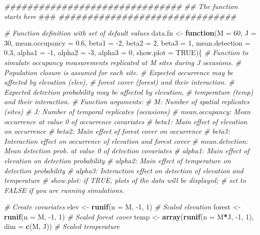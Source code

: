 \documentclass[
]{book}
\newenvironment{Shaded}{\begin{snugshade}}{\end{snugshade}}
\newcommand{\AlertTok}[1]{\textcolor[rgb]{0.94,0.16,0.16}{#1}}
\newcommand{\CommentTok}[1]{\textcolor[rgb]{0.56,0.35,0.01}{\textit{#1}}}
\newcommand{\ControlFlowTok}[1]{\textcolor[rgb]{0.13,0.29,0.53}{\textbf{#1}}}
\newcommand{\DataTypeTok}[1]{\textcolor[rgb]{0.13,0.29,0.53}{#1}}
\newcommand{\DecValTok}[1]{\textcolor[rgb]{0.00,0.00,0.81}{#1}}
\newcommand{\FloatTok}[1]{\textcolor[rgb]{0.00,0.00,0.81}{#1}}
\newcommand{\KeywordTok}[1]{\textcolor[rgb]{0.13,0.29,0.53}{\textbf{#1}}}
\newcommand{\NormalTok}[1]{#1}
\newcommand{\OperatorTok}[1]{\textcolor[rgb]{0.81,0.36,0.00}{\textbf{#1}}}
\newcommand{\OtherTok}[1]{\textcolor[rgb]{0.56,0.35,0.01}{#1}}
\newcommand{\StringTok}[1]{\textcolor[rgb]{0.31,0.60,0.02}{#1}}
\begin{document}
\begin{Shaded}
\begin{Highlighting}[]
\CommentTok{###############################}
\CommentTok{## The function starts here }\AlertTok{###}
\CommentTok{###############################}

\CommentTok{# Function definition with set of default values}
\NormalTok{data.fn <-}\StringTok{ }\ControlFlowTok{function}\NormalTok{(}\DataTypeTok{M =} \DecValTok{60}\NormalTok{, }\DataTypeTok{J =} \DecValTok{30}\NormalTok{, }\DataTypeTok{mean.occupancy =} \FloatTok{0.6}\NormalTok{, }
                    \DataTypeTok{beta1 =} \DecValTok{-2}\NormalTok{, }\DataTypeTok{beta2 =} \DecValTok{2}\NormalTok{, }\DataTypeTok{beta3 =} \DecValTok{1}\NormalTok{, }\DataTypeTok{mean.detection =} \FloatTok{0.3}\NormalTok{, }
                    \DataTypeTok{alpha1 =} \DecValTok{-1}\NormalTok{, }\DataTypeTok{alpha2 =} \DecValTok{-3}\NormalTok{, }\DataTypeTok{alpha3 =} \DecValTok{0}\NormalTok{, }\DataTypeTok{show.plot =} \OtherTok{TRUE}\NormalTok{)\{}
\CommentTok{# Function to simulate occupancy measurements replicated at M sites during J occasions.}
\CommentTok{# Population closure is assumed for each site.}
\CommentTok{# Expected occurrence may be affected by elevation (elev), }
\CommentTok{# forest cover (forest) and their interaction.}
\CommentTok{# Expected detection probability may be affected by elevation, }
\CommentTok{# temperature (temp) and their interaction.}
\CommentTok{# Function arguments:}
\CommentTok{#     M: Number of spatial replicates (sites)}
\CommentTok{#     J: Number of temporal replicates (occasions)}
\CommentTok{#     mean.occupancy: Mean occurrence at value 0 of occurrence covariates}
\CommentTok{#     beta1: Main effect of elevation on occurrence}
\CommentTok{#     beta2: Main effect of forest cover on occurrence}
\CommentTok{#     beta3: Interaction effect on occurrence of elevation and forest cover}
\CommentTok{#     mean.detection: Mean detection prob. at value 0 of detection covariates}
\CommentTok{#     alpha1: Main effect of elevation on detection probability}
\CommentTok{#     alpha2: Main effect of temperature on detection probability}
\CommentTok{#     alpha3: Interaction effect on detection of elevation and temperature}
\CommentTok{#     show.plot: if TRUE, plots of the data will be displayed; }
\CommentTok{#               set to FALSE if you are running simulations.}

\CommentTok{# Create covariates}
\NormalTok{elev <-}\StringTok{ }\KeywordTok{runif}\NormalTok{(}\DataTypeTok{n =}\NormalTok{ M, }\DecValTok{-1}\NormalTok{, }\DecValTok{1}\NormalTok{)                         }\CommentTok{# Scaled elevation}
\NormalTok{forest <-}\StringTok{ }\KeywordTok{runif}\NormalTok{(}\DataTypeTok{n =}\NormalTok{ M, }\DecValTok{-1}\NormalTok{, }\DecValTok{1}\NormalTok{)                       }\CommentTok{# Scaled forest cover}
\NormalTok{temp <-}\StringTok{ }\KeywordTok{array}\NormalTok{(}\KeywordTok{runif}\NormalTok{(}\DataTypeTok{n =}\NormalTok{ M}\OperatorTok{*}\NormalTok{J, }\DecValTok{-1}\NormalTok{, }\DecValTok{1}\NormalTok{), }\DataTypeTok{dim =} \KeywordTok{c}\NormalTok{(M, J)) }\CommentTok{# Scaled temperature}


\end{Highlighting}
\end{Shaded}
\end{document}
